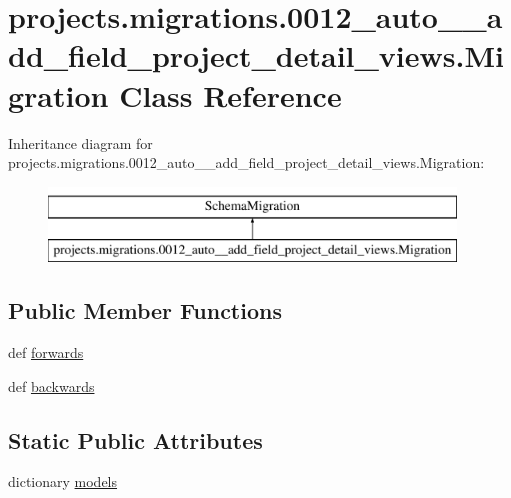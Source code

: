 \hypertarget{classprojects_1_1migrations_1_10012__auto____add__field__project__detail__views_1_1_migration}{\section{projects.\-migrations.0012\-\_\-auto\-\_\-\-\_\-add\-\_\-field\-\_\-project\-\_\-detail\-\_\-views.Migration Class Reference}
\label{classprojects_1_1migrations_1_10012__auto____add__field__project__detail__views_1_1_migration}
}
Inheritance diagram for projects.\-migrations.0012\-\_\-auto\-\_\-\-\_\-add\-\_\-field\-\_\-project\-\_\-detail\-\_\-views.Migration\-:\begin{figure}[H]
\begin{center}
\leavevmode
\includegraphics[height=2.000000cm]{classprojects_1_1migrations_1_10012__auto____add__field__project__detail__views_1_1_migration}
\end{center}
\end{figure}
\subsection*{Public Member Functions}
\begin{DoxyCompactItemize}
\item 
def \hyperlink{classprojects_1_1migrations_1_10012__auto____add__field__project__detail__views_1_1_migration_aad1085492957136145cced46dd95f3eb}{forwards}
\item 
def \hyperlink{classprojects_1_1migrations_1_10012__auto____add__field__project__detail__views_1_1_migration_a1af9247e9548218888f79552e720d5d8}{backwards}
\end{DoxyCompactItemize}
\subsection*{Static Public Attributes}
\begin{DoxyCompactItemize}
\item 
dictionary \hyperlink{classprojects_1_1migrations_1_10012__auto____add__field__project__detail__views_1_1_migration_aa26c5209e1f46bab912e3af64b98d307}{models}
\end{DoxyCompactItemize}


